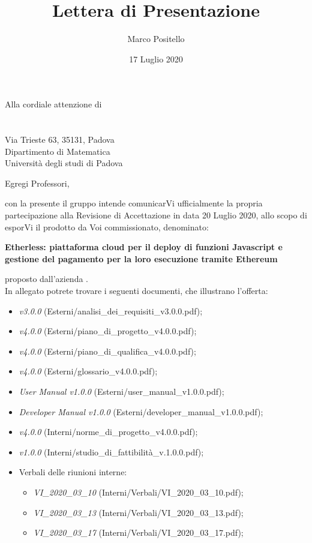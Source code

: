 \documentclass[a4paper]{letter}
\title{Lettera di Presentazione}
\author{Marco Positello}
\begin{document}
\begin{letter} {Alla cordiale attenzione di \\ \TV \\ \RC \\ Via Trieste 63, 35131, Padova\\ Dipartimento di Matematica \\ Università degli studi di Padova }
  \vspace*{-0.4\baselineskip}
\date{17 Luglio 2020}
\opening{Egregi Professori,}
con la presente il gruppo \Gruppo{} intende comunicarVi ufficialmente la propria partecipazione alla Revisione di Accettazione in data 20 Luglio 2020, allo scopo di esporVi il prodotto da Voi commissionato, denominato:
  \begin{center}
    \textbf{Etherless: piattaforma cloud per il deploy di funzioni Javascript e gestione del pagamento per la loro esecuzione tramite Ethereum}
  \end{center}
  proposto dall'azienda \Proponente.\\
  In allegato potrete trovare i seguenti documenti, che illustrano l'offerta:
  \begin{itemize}
    \item \AdR{} \textit{v3.0.0} (Esterni/analisi\_dei\_requisiti\_v3.0.0.pdf);
    \item \PdP{} \textit{v4.0.0} (Esterni/piano\_di\_progetto\_v4.0.0.pdf);
    \item \PdQ{} \textit{v4.0.0} (Esterni/piano\_di\_qualifica\_v4.0.0.pdf);
    \item \Glossario{} \textit{v4.0.0} (Esterni/glossario\_v4.0.0.pdf);
		\item \textit{User Manual v1.0.0} (Esterni/user\_manual\_v1.0.0.pdf);
		\item \textit{Developer Manual v1.0.0} (Esterni/developer\_manual\_v1.0.0.pdf);
    \item \NdP{} \textit{v4.0.0} (Interni/norme\_di\_progetto\_v4.0.0.pdf);
    \item \SdF{} \textit{v1.0.0} (Interni/studio\_di\_fattibilità\_v.1.0.0.pdf);
    \item Verbali delle riunioni interne:
      \begin{itemize}
      				\item \textit{VI\_2020\_03\_10} (Interni/Verbali/VI\_2020\_03\_10.pdf);
				\item \textit{VI\_2020\_03\_13} (Interni/Verbali/VI\_2020\_03\_13.pdf);
				\item \textit{VI\_2020\_03\_17} (Interni/Verbali/VI\_2020\_03\_17.pdf);

\end{itemize}
\end{itemize}
\end{letter}
\end{document}
